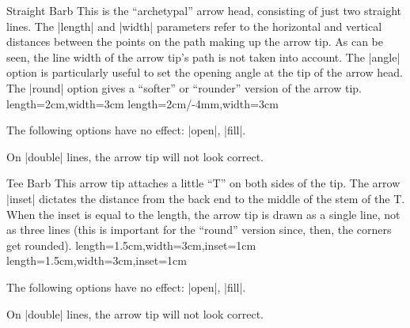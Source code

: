 \begin{arrowtip}{Straight Barb}{
    This is the ``archetypal'' arrow head, consisting of just two straight
    lines. The |length| and |width| parameters refer to the horizontal and
    vertical distances between the points on the path making up the arrow tip.
    As can be seen, the line width of the arrow tip's path is not taken into
    account. The |angle| option is particularly useful to set the opening angle
    at the tip of the arrow head. The |round| option gives a ``softer'' or
    ``rounder'' version of the arrow tip.
}%
{length=2cm,width=3cm}%
{length=2cm/-4mm,width=3cm}

    \begin{arrowexamples}
        \arrowexample[]
        \arrowexampledup[]
        \arrowexampledupdot[]
        \arrowexample[length=5pt]
        \arrowexample[length=5pt,width=5pt]
        \arrowexample[line width=2pt]
        \arrowexample[reversed]
        \arrowexample[angle=60:2pt 3]
        \arrowexample[round]
        \arrowexample[slant=.3]
        \arrowexample[left]
        \arrowexample[right]
        \arrowexample[red]
    \end{arrowexamples}
    The following options have no effect: |open|, |fill|.

    On |double| lines, the arrow tip will not look correct.
\end{arrowtip}

\begin{arrowtip}{Tee Barb}{
    This arrow tip attaches a little ``T'' on both sides of the tip. The arrow
    |inset| dictates the distance from the back end to the middle of the stem
    of the T. When the inset is equal to the length, the arrow tip is drawn as
    a single line, not as three lines (this is important for the ``round''
    version since, then, the corners get rounded).
}%
{length=1.5cm,width=3cm,inset=1cm}%
{length=1.5cm,width=3cm,inset=1cm}

    \begin{arrowexamples}
        \arrowexample[]
        \arrowexampledup[sep]
        \arrowexampledupdot[sep]
        \arrowexample[inset=0pt]
        \arrowexample[inset'=0pt 1]
        \arrowexample[line width=2pt]
        \arrowexample[round]
        \arrowexample[round,inset'=0pt 1]
        \arrowexample[slant=.3]
        \arrowexample[left]
        \arrowexample[right]
        \arrowexample[red]
    \end{arrowexamples}
    The following options have no effect: |open|, |fill|.

    On |double| lines, the arrow tip will not look correct.
\end{arrowtip}


